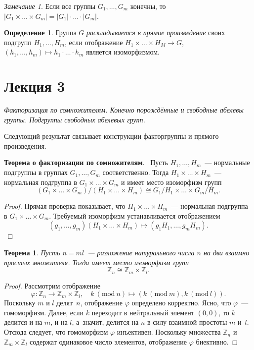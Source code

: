 \documentclass[a4paper,10pt]{amsart}
\def\ZZ{{\mathbb Z}}%
\newtheorem{theorem}{Теорема}
\theoremstyle{definition}
\newtheorem{definition}{Определение}
\theoremstyle{remark}
\newtheorem{remark}{Замечание}
\begin{document}
\begin{remark}
Если все группы $G_1, \ldots, G_m$ конечны, то $|G_1 \times \ldots
\times G_m| = |G_1| \cdot \ldots \cdot |G_m|$.
\end{remark}

\begin{definition}
Группа $G$ \textit{раскладывается в прямое произведение} своих подгрупп $H_1, \ldots, H_m$, если отображение $H_1 \times \ldots \times H_M \rightarrow G$, $(h_1, \ldots, h_m) \mapsto h_1 \cdot \ldots \cdot h_m$ является изоморфизмом.
\end{definition}


\newpage

\section*{Лекция 3}

\medskip

{\it Факторизация по
сомножителям. Конечно порождённые и свободные абелевы группы. Подгруппы
свободных абелевых групп.}

\medskip

Следующий результат связывает конструкции факторгруппы и прямого
произведения.

{\bf Теорема о факторизации по сомножителям}. \ Пусть $H_1, \ldots,
H_m$~--- нормальные подгруппы в группах $G_1, \ldots, G_m$
соответственно. Тогда $H_1 \times \ldots \times H_m$~--- нормальная
подгруппа в $G_1 \times \ldots \times G_m$ и имеет место изоморфизм
групп
$$
(G_1 \times \ldots \times G_m) / (H_1 \times \ldots \times H_m)
\cong G_1 / H_1 \times \ldots \times G_m / H_m.
$$

\begin{proof}
Прямая проверка показывает, что $H_1\times\ldots\times H_m$~---
нормальная подгруппа в $G_1\times\ldots\times G_m$. Требуемый
изоморфизм устанавливается отображением
$$
(g_1,\ldots,g_m)(H_1\times\ldots\times H_m)\mapsto
(g_1H_1,\ldots,g_mH_m).
$$
\end{proof}

\begin{theorem}
Пусть $n=ml$~--- разложение натурального числа $n$ на два взаимно
простых множителя. Тогда имеет место изоморфизм групп
$$
\ZZ_n\cong \ZZ_m\times\ZZ_l.
$$
\end{theorem}

\begin{proof}
Рассмотрим отображение
$$
\varphi\colon \ZZ_n\to \ZZ_m\times\ZZ_l, \quad k \ (\text{mod}\ n)
\mapsto (k\ (\text{mod}\ m), k\ (\text{mod}\  l)).
$$
Поскольку $m$ и $l$ делят~$n$, отображение $\varphi$ определено
корректно. Ясно, что $\varphi$~--- гомоморфизм. Далее, если $k$
переходит в нейтральный элемент $(0,0)$, то $k$ делится и на $m$, и
на $l$, а~значит, делится на $n$ в силу взаимной простоты $m$ и~$l$.
Отсюда следует, что гомоморфизм $\varphi$ инъективен. Поскольку
множества $\ZZ_n$ и $\ZZ_m\times\ZZ_l$ содержат одинаковое число
элементов, отображение $\varphi$ биективно.
\end{proof}
\end{document}
